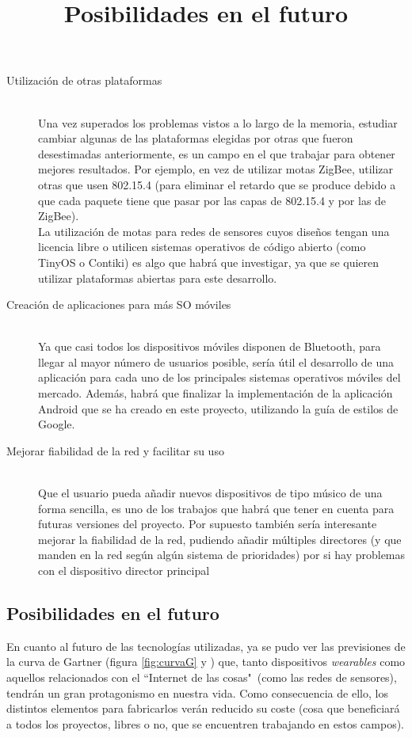 \begin{description}
    \item[Utilización de otras plataformas] \hfill \\
      Una vez superados los problemas vistos a lo largo de la memoria, estudiar cambiar algunas de las plataformas
      elegidas por otras que fueron desestimadas anteriormente, es un campo en el que trabajar para obtener mejores
      resultados. Por ejemplo, en vez de utilizar motas ZigBee, utilizar otras que usen 802.15.4 (para eliminar
      el retardo que se produce debido a que cada paquete tiene que pasar por las capas de 802.15.4 y por las de ZigBee).\\
      La utilización de motas para redes de sensores cuyos diseños tengan una licencia libre o utilicen sistemas
      operativos de código abierto (como TinyOS o Contiki) es algo que habrá que investigar, ya que se quieren
      utilizar plataformas abiertas para este desarrollo.

    \item[Creación de aplicaciones para más SO móviles] \hfill \\
      Ya que casi todos los dispositivos móviles disponen de Bluetooth, para llegar al mayor número de usuarios
      posible, sería útil el desarrollo de una aplicación para cada uno de los principales sistemas operativos
      móviles del mercado. Además, habrá que finalizar la implementación de la aplicación Android que se ha creado
      en este proyecto, utilizando la guía de estilos de Google.

     \item[Mejorar fiabilidad de la red y facilitar su uso] \hfill \\
      Que el usuario pueda añadir nuevos dispositivos de tipo músico de una forma sencilla, es uno de los
      trabajos que habrá que tener en cuenta para futuras versiones del proyecto. Por supuesto
      también sería interesante mejorar la fiabilidad de la red, pudiendo añadir múltiples directores
      (y que manden en la red según algún sistema de prioridades) por si hay problemas con el
      dispositivo director principal

\end{description}

\subsection{Posibilidades en el futuro}
\title{Posibilidades en el futuro}
En cuanto al futuro de las tecnologías utilizadas, ya se pudo ver las previsiones
de la curva de Gartner (figura \ref{fig:curvaG} y \cite{gartnercurve}) que, tanto dispositivos \textit{wearables} como
aquellos relacionados con el ``Internet de las cosas"\ (como las redes de sensores), tendrán un gran protagonismo
en nuestra vida. Como consecuencia de ello, los distintos elementos para fabricarlos
verán reducido su coste (cosa que beneficiará a todos los proyectos, libres o no, que se encuentren trabajando en estos
campos).\\

